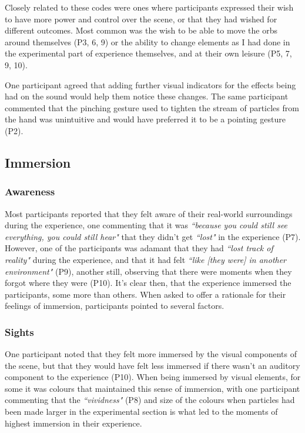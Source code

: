 Closely related to these codes were ones where participants expressed their wish to have more power and control over the scene, or that they had wished for different outcomes. Most common was the wish to be able to move the orbs around themselves (P3, 6, 9) or the ability to change elements as I had done in the experimental part of experience themselves, and at their own leisure (P5, 7, 9, 10).

One participant agreed that adding further visual indicators for the effects being had on the sound would help them notice these changes. The same participant commented that the pinching gesture used to tighten the stream of particles from the hand was unintuitive and would have preferred it to be a pointing gesture (P2).

\subsection{Immersion}\label{sec: polaris-feedback-immersion}
\subsubsection{Awareness}\label{sec: polaris-feedback-immersion-awareness}
Most participants reported that they felt aware of their real-world surroundings during the experience, one commenting that it was \textit{``because you could still see everything, you could still hear"} that they didn’t get \textit{``lost"} in the experience (P7). However, one of the participants was adamant that they had \textit{``lost track of reality"} during the experience, and that it had felt \textit{``like [they were] in another environment"} (P9), another still, observing that there were moments when they forgot where they were (P10). It’s clear then, that the experience immersed the participants, some more than others. When asked to offer a rationale for their feelings of immersion, participants pointed to several factors.

\subsubsection{Sights}\label{sec: polaris-feedback-immersion-sights}
One participant noted that they felt more immersed by the visual components of the scene, but that they would have felt less immersed if there wasn’t an auditory component to the experience (P10). When being immersed by visual elements, for some it was colours that maintained this sense of immersion, with one participant commenting that the \textit{``vividness"} (P8) and size of the colours when particles had been made larger in the experimental section is what led to the moments of highest immersion in their experience.

